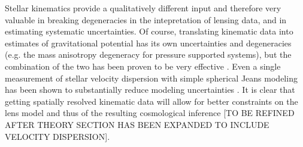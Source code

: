 Stellar kinematics provide a qualitatively different input and
therefore very valuable in breaking degeneracies in the intepretation
of lensing data, and in estimating systematic uncertainties. Of
course, translating kinematic data into estimates of gravitational
potential has its own uncertainties and degeneracies (e.g. the mass
anisotropy degeneracy for pressure supported systems), but the
combination of the two has been proven to be very effective
\cite{T+K04}. Even a single measurement of stellar velocity dispersion
with simple spherical Jeans modeling has been shown to substantially
reduce modeling uncertainties \cite{TK02,Koo++03,Suy++14}. It is clear
that getting spatially resolved kinematic data will allow for better
constraints on the lens model and thus of the resulting cosmological
inference [TO BE REFINED AFTER THEORY SECTION HAS BEEN EXPANDED TO
INCLUDE VELOCITY DISPERSION].

